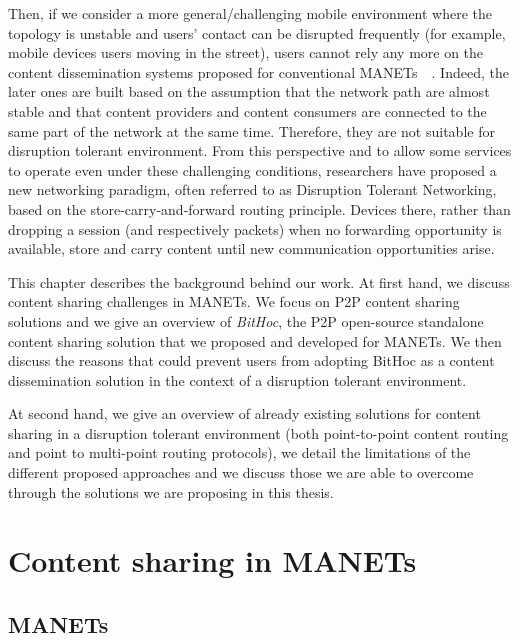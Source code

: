 Then, if we consider a more general/challenging mobile environment where the topology is unstable and users' contact can be disrupted frequently (for example, mobile devices users moving in the street), users cannot rely any more on the content dissemination systems proposed for conventional MANETs~\cite{BitHoc}~\cite{BlueTorrent}. Indeed, the later ones are built based on the assumption that the network path are almost stable and that content providers and content consumers are connected to the same part of the network at the same time. Therefore, they are not suitable for disruption tolerant environment. From this perspective and to allow some services to operate even under
these challenging conditions, researchers have proposed a new networking paradigm, often referred to as Disruption Tolerant Networking, based on the store-carry-and-forward routing principle. Devices there, rather than dropping a session (and respectively packets) when no forwarding opportunity is available, store and carry
content until new communication opportunities arise. 

This chapter describes the background behind our work. At first hand, we discuss content sharing challenges in MANETs. We focus on P2P content sharing solutions and we give an overview of \emph{BitHoc}, the P2P open-source standalone content sharing solution that we proposed and developed for MANETs. We then discuss the reasons that could prevent users from adopting BitHoc as a content dissemination solution in the context of a disruption tolerant environment. 

At second hand, we give an overview of already existing solutions for content sharing in a disruption tolerant environment (both point-to-point content routing and point to multi-point routing protocols), we detail the limitations of the different proposed approaches and we discuss those we are able to overcome through the solutions we are proposing in this thesis.

\section{Content sharing in MANETs}

\subsection{MANETs}

